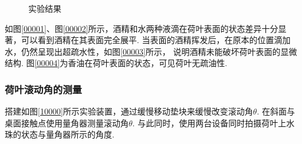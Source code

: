 \documentclass[a4paper,12pt]{article}%
\begin{document}
\begin{figure}[H]
{        }
    \caption{实验结果}
\end{figure}
\begin{spacing}{1.528}%
如图\ref{00001}、图\ref{00002}所示，酒精和水两种液滴在荷叶表面的状态差异十分显著，可以看到酒精在其表面完全展平. 
当表面的酒精挥发后，在原本的位置滴加水，仍然呈现出超疏水性，如图\ref{00003}所示，
说明酒精未能破坏荷叶表面的显微结构. 
图\ref{00004}为香油在荷叶表面的状态，可见荷叶无疏油性. 
\end{spacing}

\subsubsection{荷叶滚动角的测量}
\begin{spacing}{1.528}%
搭建如图\ref{10000}所示实验装置，通过缓慢移动垫块来缓慢改变滚动角$\theta$. 在斜面与桌面接触点使用量角器测量滚动角$\theta$. 
与此同时，使用两台设备同时拍摄荷叶上水珠的状态与量角器所示的角度. 
\end{spacing}
\end{document}
